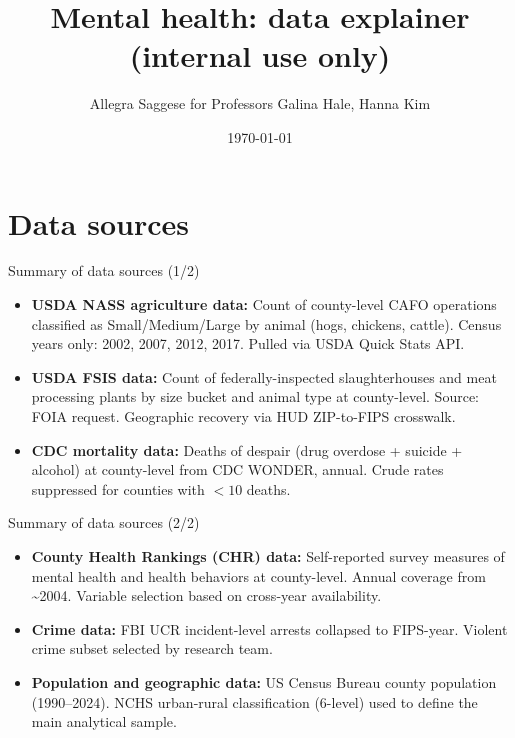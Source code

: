 \documentclass[aspectratio=169]{beamer}
\title{Mental health: data explainer (internal use only)}
\author{Allegra Saggese for Professors Galina Hale, Hanna Kim}
\date{\today}
\begin{document}
\begin{frame}
  \titlepage
\end{frame}


\section{Data sources}

\begin{frame}{Summary of data sources (1/2)}
\begin{itemize}
    \item \textbf{USDA NASS agriculture data:} Count of county-level CAFO operations classified as Small/Medium/Large by animal (hogs, chickens, cattle). Census years only: 2002, 2007, 2012, 2017. Pulled via USDA Quick Stats API.
    \item \textbf{USDA FSIS data:} Count of federally-inspected slaughterhouses and meat processing plants by size bucket and animal type at county-level. Source: FOIA request. Geographic recovery via HUD ZIP-to-FIPS crosswalk.
    \item \textbf{CDC mortality data:} Deaths of despair (drug overdose + suicide + alcohol) at county-level from CDC WONDER, annual. Crude rates suppressed for counties with $<10$ deaths.
\end{itemize}
\end{frame}


\begin{frame}{Summary of data sources (2/2)}
\begin{itemize}
    \item \textbf{County Health Rankings (CHR) data:} Self-reported survey measures of mental health and health behaviors at county-level. Annual coverage from \textasciitilde2004. Variable selection based on cross-year availability.
    \item \textbf{Crime data:} FBI UCR incident-level arrests collapsed to FIPS-year. Violent crime subset selected by research team.
    \item \textbf{Population and geographic data:} US Census Bureau county population (1990--2024). NCHS urban-rural classification (6-level) used to define the main analytical sample.
\end{itemize}
\end{frame}
\end{document}
